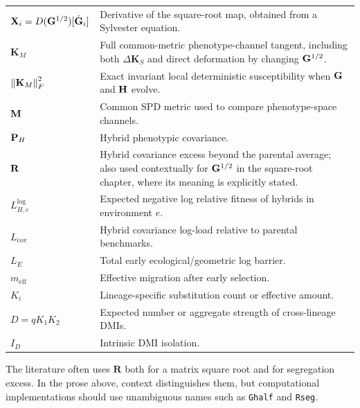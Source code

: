 \begin{longtable}{@{}p{}p{}@{}}
\(\mathbf X_i=D(\mathbf{G}^{1/2})[\dot{\mathbf{G}}_i]\) & Derivative of the square-root map, obtained from a Sylvester equation. \\
\(\mathbf K_M\) & Full common-metric phenotype-channel tangent, including both \(\Delta\mathbf K_S\) and direct deformation by changing \(\mathbf{G}^{1/2}\). \\
\(\left\lVert \mathbf K_M\right\rVert_F^2\) & Exact invariant local deterministic susceptibility when \(\mathbf{G}\) and \(\mathbf{H}\) evolve. \\
\(\mathbf{M}\) & Common SPD metric used to compare phenotype-space channels. \\
\(\mathbf{P}_H\) & Hybrid phenotypic covariance. \\
\(\mathbf{R}\) & Hybrid covariance excess beyond the parental average; also used contextually for \(\mathbf{G}^{1/2}\) in the square-root chapter, where its meaning is explicitly stated. \\
\(L^{\log}_{H,e}\) & Expected negative log relative fitness of hybrids in environment \(e\). \\
\(L_{\mathrm{cov}}\) & Hybrid covariance log-load relative to parental benchmarks. \\
\(L_E\) & Total early ecological/geometric log barrier. \\
\(m_{\mathrm{eff}}\) & Effective migration after early selection. \\
\(K_i\) & Lineage-specific substitution count or effective amount. \\
\(D=qK_1K_2\) & Expected number or aggregate strength of cross-lineage DMIs. \\
\(I_D\) & Intrinsic DMI isolation. \\
\bottomrule
\end{longtable}

\begin{cautionbox}[title={One notation collision deliberately avoided in computation}]
The literature often uses \(\mathbf R\) both for a matrix square root and for segregation excess. In the prose above, context distinguishes them, but computational implementations should use unambiguous names such as \texttt{Ghalf} and \texttt{Rseg}.
\end{cautionbox}
